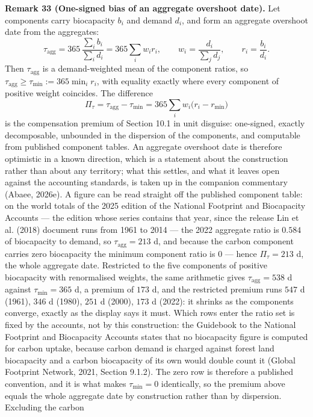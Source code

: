 \documentclass[11pt]{article}
\begin{document}
\textbf{Remark 33 (One-signed bias of an aggregate overshoot date).} Let components carry biocapacity
\(b_i\) and demand \(d_i\), and form an aggregate overshoot date from the aggregates:
\[ \tau_{\mathrm{agg}}=365\,\frac{\sum_ib_i}{\sum_id_i}=365\sum_iw_ir_i, \qquad w_i=\frac{d_i}{\sum_jd_j}, \qquad r_i=\frac{b_i}{d_i}. \]
Then \(\tau_{\mathrm{agg}}\) is a demand-weighted mean of the component ratios, so
\(\tau_{\mathrm{agg}}\ge\tau_{\min}:=365\min_ir_i\), with equality exactly where every component of
positive weight coincides. The difference
\[ \Pi_\tau=\tau_{\mathrm{agg}}-\tau_{\min}=365\sum_iw_i\bigl(r_i-r_{\min}\bigr) \]
is the compensation premium of Section 10.1 in unit disguise: one-signed, exactly decomposable,
unbounded in the dispersion of the components, and computable from published component tables. An aggregate overshoot date is therefore optimistic in a known direction, which is a statement about the construction rather than about any territory; what this settles, and what it leaves open against the accounting standards, is taken up in the companion commentary (Abaee, 2026e). A figure can be read straight off the published component table: on the world totals of the 2025 edition of the National Footprint and Biocapacity Accounts --- the edition whose series contains that year, since the release Lin et al. (2018) document runs from 1961 to 2014 --- the 2022 aggregate ratio is \(0.584\) of biocapacity to demand, so \(\tau_{\mathrm{agg}} = 213\) d, and because the carbon component carries zero
biocapacity the minimum component ratio is \(0\) --- hence \(\Pi_\tau = 213\) d, the whole aggregate date.
Restricted to the five components of positive biocapacity with renormalised weights, the same arithmetic
gives \(\tau_{\mathrm{agg}} = 538\) d against \(\tau_{\min} = 365\) d, a premium of \(173\) d, and the
restricted premium runs \(547\) d (1961), \(346\) d (1980), \(251\) d (2000), \(173\) d (2022): it shrinks as the
components converge, exactly as the display says it must. Which rows enter the ratio set is fixed by the accounts, not by this
construction: the Guidebook to the National Footprint and Biocapacity Accounts states that no biocapacity
figure is computed for carbon uptake, because carbon demand is charged against forest land biocapacity and a
carbon biocapacity of its own would double count it (Global Footprint Network, 2021, Section 9.1.2). The zero
row is therefore a published convention, and it is what makes \(\tau_{\min} = 0\) identically, so the premium
above equals the whole aggregate date by construction rather than by dispersion. Excluding the carbon
\end{document}
